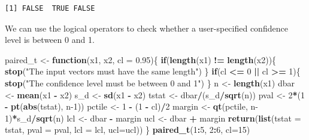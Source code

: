 \documentclass[
]{krantz}
\makeatletter
\newenvironment{Shaded}{\begin{snugshade}}{\end{snugshade}}
\newcommand{\ControlFlowTok}[1]{\textcolor[rgb]{0.27,0.27,0.27}{\textbf{#1}}}
\newcommand{\DataTypeTok}[1]{\textcolor[rgb]{0.27,0.27,0.27}{#1}}
\newcommand{\DecValTok}[1]{\textcolor[rgb]{0.06,0.06,0.06}{#1}}
\newcommand{\FloatTok}[1]{\textcolor[rgb]{0.06,0.06,0.06}{#1}}
\newcommand{\KeywordTok}[1]{\textcolor[rgb]{0.27,0.27,0.27}{\textbf{#1}}}
\newcommand{\NormalTok}[1]{#1}
\newcommand{\OperatorTok}[1]{\textcolor[rgb]{0.43,0.43,0.43}{\textbf{#1}}}
\newcommand{\StringTok}[1]{\textcolor[rgb]{0.5,0.5,0.5}{#1}}
\newenvironment{kframe}{%
\medskip{}
\setlength{\fboxsep}{.8em}
 \def\at@end@of@kframe{}%
 \ifinner\ifhmode%
  \def\at@end@of@kframe{\end{minipage}}%
  \begin{minipage}{\columnwidth}%
 \fi\fi%
 \def\FrameCommand##1{\hskip\@totalleftmargin \hskip-\fboxsep
 \colorbox{shadecolor}{##1}\hskip-\fboxsep
     \hskip-\linewidth \hskip-\@totalleftmargin \hskip\columnwidth}%
 \MakeFramed {\advance\hsize-\width
   \@totalleftmargin\z@ \linewidth\hsize
   \@setminipage}}%
 {\par\unskip\endMakeFramed%
 \at@end@of@kframe}
\renewenvironment{Shaded}{\begin{kframe}}{\end{kframe}}
\makeatother
\begin{document}
\begin{verbatim}
[1] FALSE  TRUE FALSE
\end{verbatim}

We can use the logical operators to check whether a user-specified confidence level is between 0 and 1.

\begin{Shaded}
\begin{Highlighting}[]
\NormalTok{paired\_t \textless{}{-}}\StringTok{ }\ControlFlowTok{function}\NormalTok{(x1, x2, }\DataTypeTok{cl =} \FloatTok{0.95}\NormalTok{)\{}
    \ControlFlowTok{if}\NormalTok{(}\KeywordTok{length}\NormalTok{(x1) }\OperatorTok{!=}\StringTok{ }\KeywordTok{length}\NormalTok{(x2))\{}
        \KeywordTok{stop}\NormalTok{(}\StringTok{"The input vectors  must have the same length"}\NormalTok{)}
\NormalTok{    \}}
    \ControlFlowTok{if}\NormalTok{(cl }\OperatorTok{\textless{}=}\StringTok{ }\DecValTok{0} \OperatorTok{||}\StringTok{ }\NormalTok{cl }\OperatorTok{\textgreater{}=}\StringTok{ }\DecValTok{1}\NormalTok{)\{}
        \KeywordTok{stop}\NormalTok{(}\StringTok{"The confidence level must be between 0 and 1"}\NormalTok{)}
\NormalTok{    \}}
\NormalTok{    n \textless{}{-}}\StringTok{ }\KeywordTok{length}\NormalTok{(x1)}
\NormalTok{    dbar \textless{}{-}}\StringTok{ }\KeywordTok{mean}\NormalTok{(x1 }\OperatorTok{{-}}\StringTok{ }\NormalTok{x2)}
\NormalTok{    s\_d \textless{}{-}}\StringTok{ }\KeywordTok{sd}\NormalTok{(x1 }\OperatorTok{{-}}\StringTok{ }\NormalTok{x2)}
\NormalTok{    tstat \textless{}{-}}\StringTok{ }\NormalTok{dbar}\OperatorTok{/}\NormalTok{(s\_d}\OperatorTok{/}\KeywordTok{sqrt}\NormalTok{(n))}
\NormalTok{    pval \textless{}{-}}\StringTok{ }\DecValTok{2}\OperatorTok{*}\NormalTok{(}\DecValTok{1} \OperatorTok{{-}}\StringTok{ }\KeywordTok{pt}\NormalTok{(}\KeywordTok{abs}\NormalTok{(tstat), n}\DecValTok{{-}1}\NormalTok{))}
\NormalTok{    pctile \textless{}{-}}\StringTok{ }\DecValTok{1} \OperatorTok{{-}}\StringTok{ }\NormalTok{(}\DecValTok{1} \OperatorTok{{-}}\StringTok{ }\NormalTok{cl)}\OperatorTok{/}\DecValTok{2}
\NormalTok{    margin \textless{}{-}}\StringTok{ }\KeywordTok{qt}\NormalTok{(pctile, n}\DecValTok{{-}1}\NormalTok{)}\OperatorTok{*}\NormalTok{s\_d}\OperatorTok{/}\KeywordTok{sqrt}\NormalTok{(n)}
\NormalTok{    lcl \textless{}{-}}\StringTok{ }\NormalTok{dbar }\OperatorTok{{-}}\StringTok{ }\NormalTok{margin}
\NormalTok{    ucl \textless{}{-}}\StringTok{ }\NormalTok{dbar }\OperatorTok{+}\StringTok{ }\NormalTok{margin}
    \KeywordTok{return}\NormalTok{(}\KeywordTok{list}\NormalTok{(}\DataTypeTok{tstat =}\NormalTok{ tstat, }\DataTypeTok{pval =}\NormalTok{ pval, }\DataTypeTok{lcl =}\NormalTok{ lcl, }\DataTypeTok{ucl=}\NormalTok{ucl))}
\NormalTok{\}}
\KeywordTok{paired\_t}\NormalTok{(}\DecValTok{1}\OperatorTok{:}\DecValTok{5}\NormalTok{, }\DecValTok{2}\OperatorTok{:}\DecValTok{6}\NormalTok{, }\DataTypeTok{cl=}\DecValTok{15}\NormalTok{)}
\end{Highlighting}
\end{Shaded}
\end{document}

